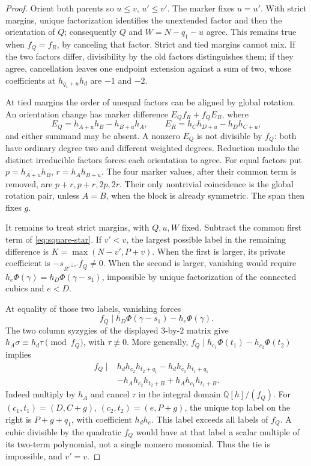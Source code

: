 \documentclass[11pt,a4paper]{amsart}
\numberwithin{equation}{section}
\theoremstyle{plain}
\theoremstyle{definition}
\newcommand{\Q}{\mathbb Q}
\begin{document}
\begin{proof}
Orient both parents so \(u\le v\), \(u'\le v'\).  The marker fixes
\(u=u'\).  With strict margins, unique factorization identifies the
unextended factor and then the orientation of \(Q\); consequently \(Q\)
and \(W=N-q_1-u\) agree.  This remains true when \(f_Q=f_R\), by
canceling that factor.  Strict and tied margins cannot mix.  If the two
factors differ, divisibility by the old factors distinguishes them; if
they agree, cancellation leaves one endpoint extension against a sum of
two, whose coefficients at \(h_{q_1+u}h_d\) are \(-1\) and \(-2\).

At tied margins the order of unequal factors can be aligned by global
rotation.  An orientation change has marker difference
\(E_Qf_R+f_QE_R\), where
\[
 E_Q=h_{A+u}h_B-h_{B+u}h_A,\qquad
 E_R=h_Ch_{D+u}-h_Dh_{C+u},
\]
and either summand may be absent.  A nonzero \(E_Q\) is not divisible
by \(f_Q\): both have ordinary degree two and different weighted degrees.
Reduction modulo the distinct irreducible factors forces each orientation
to agree.  For equal factors put \(p=h_{A+u}h_B\), \(r=h_Ah_{B+u}\).
The four marker values, after their common term is removed, are
\(p+r,p+r,2p,2r\).  Their only nontrivial coincidence is the global
rotation pair, unless \(A=B\), when the block is already symmetric.
The span then fixes \(g\).

It remains to treat strict margins, with \(Q,u,W\) fixed.  Subtract the
common first term of \eqref{eq:square-star}.  If \(v'<v\), the largest
possible label in the remaining difference is
\(K=\max(N-v',P+v)\).  When the first is larger, its private coefficient
is \(-s_{R'^{\downarrow v'}}f_Q\ne0\).  When the second is larger,
vanishing would require
\(h_e\Phi(\gamma)=h_D\Phi(\gamma-s_1)\), impossible by unique
factorization of the connected cubics and \(e<D\).

At equality of those two labels, vanishing forces
\[
 f_Q\mid h_D\Phi(\gamma-s_1)-h_e\Phi(\gamma).
\]
The two column syzygies of the displayed \(3\)-by-\(2\) matrix give
\(h_A\sigma\equiv h_d\tau\pmod{f_Q}\), with
\(\tau\not\equiv0\).  More generally,
\(f_Q\mid h_{c_1}\Phi(t_1)-h_{c_2}\Phi(t_2)\) implies
\begin{equation}\label{eq:square-residue}
 \begin{split}
 f_Q\mid {}&h_dh_{c_2}h_{t_2+q_1}-h_dh_{c_1}h_{t_1+q_1}\\
           &-h_Ah_{c_2}h_{t_2+B}+h_Ah_{c_1}h_{t_1+B}.
 \end{split}
\end{equation}
Indeed multiply by \(h_A\) and cancel \(\tau\) in the integral domain
\(\Q[h]/(f_Q)\).  For \((c_1,t_1)=(D,C+g)\),
\((c_2,t_2)=(e,P+g)\), the unique top label on the right is
\(P+g+q_1\), with coefficient \(h_dh_e\).  This label exceeds all
labels of \(f_Q\).  A cubic divisible by the quadratic \(f_Q\) would
have at that label a scalar multiple of its two-term polynomial, not a
single nonzero monomial.  Thus the tie is impossible, and \(v'=v\).


\end{proof}
\end{document}
